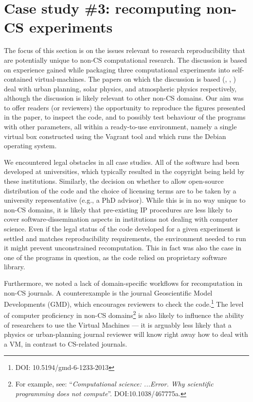 \section{Case study \#3: recomputing non-CS experiments}
\label{s:group3}

The focus of this section is on the issues relevant to research reproducibility that are potentially unique to non-CS computational research.
The discussion is based on experience gained while packaging three computational experiments into self-contained virtual-machines.
The papers on which the discussion is based (\cite{danielpaper}, \cite{bareford2010nanoflare}, \cite{arabas2013libcloud}) deal with urban planning, solar physics, and atmospheric physics respectively, although the discussion is likely relevant to other non-CS domains.
Our aim was to offer readers (or reviewers) the opportunity to reproduce the figures presented in the paper, to inspect the code, and to possibly test behaviour of the programs with other parameters, all within a ready-to-use environment, namely a single virtual box constructed using the Vagrant tool and which runs the Debian operating system.

%
We encountered legal obstacles in all case studies.
All of the software had been developed at universities, which typically resulted in the copyright being held by these institutions.
Similarly, the decision on whether to allow open-source distribution of the code and the choice of licensing terms are to be taken by a university representative (e.g., a PhD advisor).
While this is in no way unique to non-CS domains, it is likely that pre-existing IP procedures are less likely to cover software-dissemination aspects in institutions not dealing with computer science.
Even if the legal status of the code developed for a given experiment is settled and matches reproducibility requirements, the environment needed to run it might prevent unconstrained recomputation.
This in fact was also the case in one of the programs in question, as the code relied on proprietary software library.

Furthermore, we noted a lack of domain-specific workflows for recomputation in non-CS journals.
A counterexample is the journal Geoscientific Model Developments (GMD), which encourages reviewers to check the code.\footnote{DOI: 10.5194/gmd-6-1233-2013 }
The level of computer proficiency in non-CS domains\footnote{For example, see: ``\emph{Computational science: ...Error. Why scientific programming does not compute}''. DOI:10.1038/467775a.} is also likely to influence the ability of researchers to use the Virtual Machines --- it is arguably less likely that a physics or urban-planning journal reviewer will know right away how to deal with a VM, in contrast to CS-related journals.

